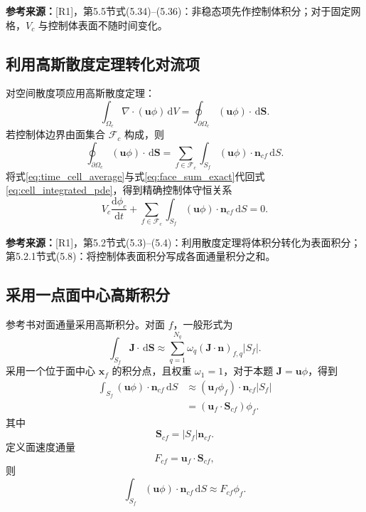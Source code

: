 \documentclass[UTF8,12pt,a4paper]{ctexart}
\numberwithin{equation}{section}
\newcommand{\Rone}{\textnormal{[R1]}}
\newcommand{\source}[1]{%
  \par\smallskip
  \noindent\colorbox{sourcebg}{%
    \parbox{0.955\linewidth}{\footnotesize\color{sourcegray}\textbf{参考来源：}#1}%
  }
  \par\smallskip
}
\newcommand{\dd}{\,\mathrm d}
\begin{document}
\source{\Rone，第5.5节式(5.34)--(5.36)：非稳态项先作控制体积分；对于固定网格，$V_c$ 与控制体表面不随时间变化。}

\subsection{利用高斯散度定理转化对流项}

对空间散度项应用高斯散度定理：
\begin{equation}
  \int_{\Omega_c}\nabla\cdot(\bm u\phi)\dd V
  =\oint_{\partial\Omega_c}(\bm u\phi)\cdot\dd\bm S.
  \label{eq:gauss}
\end{equation}
若控制体边界由面集合 $\mathcal F_c$ 构成，则
\begin{equation}
  \oint_{\partial\Omega_c}(\bm u\phi)\cdot\dd\bm S
  =\sum_{f\in\mathcal F_c}
  \int_{S_f}(\bm u\phi)\cdot\bm n_{cf}\dd S.
  \label{eq:face_sum_exact}
\end{equation}
将式\eqref{eq:time_cell_average}与式\eqref{eq:face_sum_exact}代回式\eqref{eq:cell_integrated_pde}，得到精确控制体守恒关系
\begin{equation}
  V_c\frac{\mathrm d\phi_c}{\mathrm dt}
  +\sum_{f\in\mathcal F_c}
  \int_{S_f}(\bm u\phi)\cdot\bm n_{cf}\dd S=0.
  \label{eq:exact_balance}
\end{equation}

\source{\Rone，第5.2节式(5.3)--(5.4)：利用散度定理将体积分转化为表面积分；第5.2.1节式(5.8)：将控制体表面积分写成各面通量积分之和。}

\subsection{采用一点面中心高斯积分}

参考书对面通量采用高斯积分。对面 $f$，一般形式为
\begin{equation}
  \int_{S_f}\bm J\cdot\dd\bm S
  \approx
  \sum_{q=1}^{N_q}\omega_q
  (\bm J\cdot\bm n)_{f,q}|S_f|.
  \label{eq:face_gauss_general}
\end{equation}
采用一个位于面中心 $\bm x_f$ 的积分点，且权重 $\omega_1=1$，对于本题 $\bm J=\bm u\phi$，得到
\begin{align}
  \int_{S_f}(\bm u\phi)\cdot\bm n_{cf}\dd S
  &\approx(\bm u_f\phi_f)\cdot\bm n_{cf}|S_f|
  \label{eq:midpoint1}\\
  &=(\bm u_f\cdot\bm S_{cf})\phi_f.
  \label{eq:midpoint2}
\end{align}
其中
\begin{equation}
  \bm S_{cf}=|S_f|\bm n_{cf}.
  \label{eq:area_vector}
\end{equation}
定义面速度通量
\begin{equation}
  \boxed{F_{cf}=\bm u_f\cdot\bm S_{cf}},
  \label{eq:face_flux_local}
\end{equation}
则
\begin{equation}
  \int_{S_f}(\bm u\phi)\cdot\bm n_{cf}\dd S
  \approx F_{cf}\phi_f.
  \label{eq:flux_approx}
\end{equation}
\end{document}
